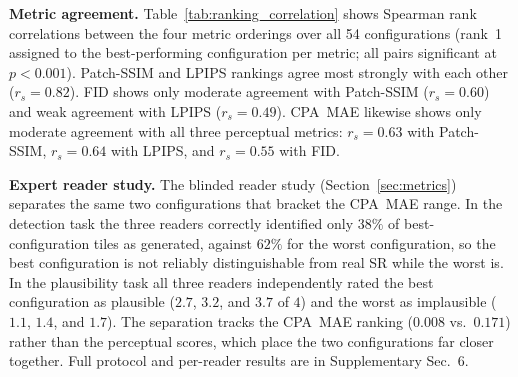 \noindent\textbf{Metric agreement.}
Table~\ref{tab:ranking_correlation} shows Spearman rank correlations between the four
metric orderings over all 54 configurations (rank~1 assigned to the best-performing
configuration per metric; all pairs significant at $p{<}0.001$).
Patch-SSIM and LPIPS rankings agree most strongly with each other ($r_s{=}0.82$).
FID shows only moderate agreement with Patch-SSIM ($r_s{=}0.60$) and weak agreement with LPIPS
($r_s{=}0.49$).
CPA~MAE likewise shows only moderate agreement with all three perceptual metrics:
$r_s{=}0.63$ with Patch-SSIM, $r_s{=}0.64$ with LPIPS, and $r_s{=}0.55$ with FID.

\noindent\textbf{Expert reader study.}
The blinded reader study (Section~\ref{sec:metrics}) separates the same two
configurations that bracket the CPA~MAE range.
In the detection task the three readers correctly identified only $38\%$ of
best-configuration tiles as generated, against $62\%$ for the worst configuration, so
the best configuration is not reliably distinguishable from real SR while the worst is.
In the plausibility task all three readers independently rated the best configuration as
plausible ($2.7$, $3.2$, and $3.7$ of $4$) and the worst as implausible ($1.1$, $1.4$,
and $1.7$).
The separation tracks the CPA~MAE ranking ($0.008$ vs.\ $0.171$) rather than the
perceptual scores, which place the two configurations far closer together.
Full protocol and per-reader results are in Supplementary Sec.~6.

